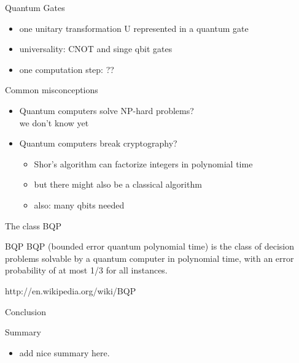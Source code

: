\documentclass[c]{beamer}
\begin{document}
\begin{frame}{Quantum Gates}
\begin{itemize}
\item one unitary transformation U represented in a quantum gate
\item universality: CNOT and singe qbit gates
\item one computation step: ??
\end{itemize}
\end{frame}


\begin{frame}{Common misconceptions}
\begin{itemize}
\item Quantum computers solve NP-hard problems? \\
 we don't know yet
\item Quantum computers break cryptography? \\
\begin{itemize}
\item Shor's algorithm can factorize integers in polynomial time
\item but there might also be a classical algorithm
\item also: many qbits needed
\end{itemize}
\end{itemize}
\end{frame}

\begin{frame}{The class BQP}
	\begin{block}{BQP}
		BQP (bounded error quantum polynomial time) is the class of decision problems solvable by a quantum computer in polynomial time, with an error probability of at most 1/3 for all instances.
	\end{block}
	http://en.wikipedia.org/wiki/BQP
\end{frame}

\begin{frame}{Conclusion}
	\begin{block}{Summary}
		\begin{itemize}
			\item add nice summary here.
		\end{itemize}
	\end{block}
\end{frame}
\end{document}
